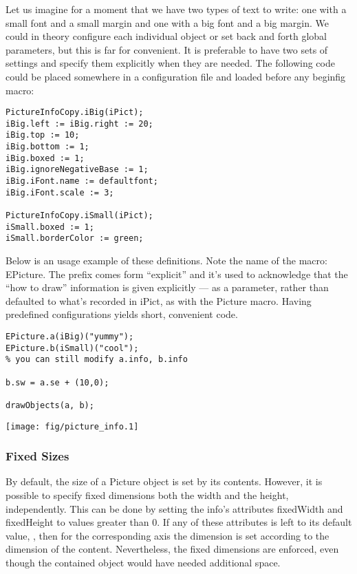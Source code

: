 \documentclass{article}
\newcommand{\code}{\ttfamily}
\begin{document}
Let us imagine for a moment that we have two types of text to write: one with a small font
and a small margin and one with a big font and a big margin. We could in theory
configure each individual object or set back and forth global parameters, but
this is far for convenient. It is preferable to have two sets of settings and specify
them explicitly when they are needed. The following code could be placed somewhere
in a configuration file and loaded before any {\code beginfig} macro:
\begin{verbatim}
PictureInfoCopy.iBig(iPict);
iBig.left := iBig.right := 20;
iBig.top := 10;
iBig.bottom := 1;
iBig.boxed := 1;
iBig.ignoreNegativeBase := 1;
iBig.iFont.name := defaultfont;
iBig.iFont.scale := 3;

PictureInfoCopy.iSmall(iPict);
iSmall.boxed := 1;
iSmall.borderColor := green;
\end{verbatim}

Below is an usage example of these definitions. Note the name of the macro: {\code EPicture}.
The prefix comes form ``explicit''  and it's used to acknowledge that the
``how to draw'' information is given explicitly --- as a parameter,
rather than defaulted to what's recorded in {\code iPict}, as with the {\code Picture} macro.
Having predefined configurations yields short, convenient code.

\begin{multicols}{2}
\begin{verbatim}
EPicture.a(iBig)("yummy");
EPicture.b(iSmall)("cool");
% you can still modify a.info, b.info

b.sw = a.se + (10,0);

drawObjects(a, b);
\end{verbatim}
\columnbreak
\hspace{1cm}\texttt{[image: fig/picture\_info.1]}
\end{multicols}

\subsubsection{Fixed Sizes}

By default, the size of a {\code Picture} object is set by its contents. However,
it is possible to specify fixed dimensions both the width and the height, independently.
This can be done by setting the {\code info}'s attributes {\code fixedWidth} and {\code fixedHeight} to values
greater than 0. If any of these attributes is left to its default value, {\code -1}, then for the corresponding
axis the dimension is set according to the dimension of the content. Nevertheless, the fixed dimensions are enforced, even though the contained object would have needed additional space.
\end{document}
